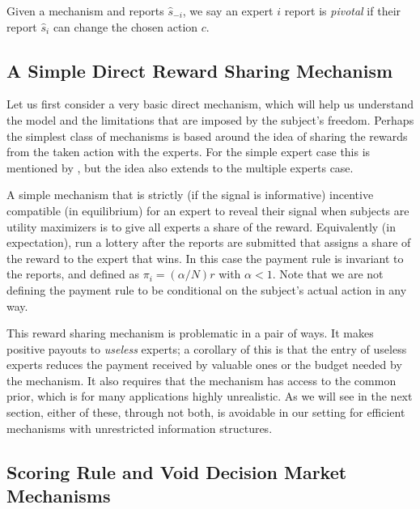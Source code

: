 \begin{defn}\label{defn:pivotal}
Given a mechanism and reports $\hat{s}_{-i}$, we say an expert $i$ report is \emph{pivotal} if their report $\hat{s}_i$ can change the chosen action $c$.
\end{defn}


\subsection{A Simple Direct Reward Sharing Mechanism}


Let us first consider a very basic direct mechanism, which will help us understand the model and the limitations that are imposed by the subject's freedom. 
Perhaps the simplest class of mechanisms is based around the idea of sharing the rewards from the taken action with the experts. For the simple expert case this is mentioned by \cite{othman2010decision}, but the idea also extends to the multiple experts case. 

A simple mechanism that is strictly (if the signal is informative) incentive compatible (in equilibrium) for an expert to reveal their signal when subjects are utility maximizers is to give all experts a share of the reward. Equivalently (in expectation), run a lottery after the reports are submitted that assigns a share of the reward to the expert that wins.
In this case the payment rule is invariant to the reports, and defined as $\pi_i  = (\alpha / N ) r $ with $\alpha < 1$. Note that we are not defining the payment rule to be conditional on the subject's actual action in any way. %

This reward sharing mechanism is problematic in a pair of ways. It makes positive payouts to \emph{useless} experts; a corollary of this is that the entry of useless experts reduces the payment received by valuable ones or the budget needed by the mechanism. It also requires that the mechanism has access to the common prior, which is for many applications highly unrealistic. 
As we will see in the next section, either of these, through not both, is avoidable in our setting for efficient mechanisms with unrestricted information structures.


\subsection{Scoring Rule and Void Decision Market Mechanisms}

